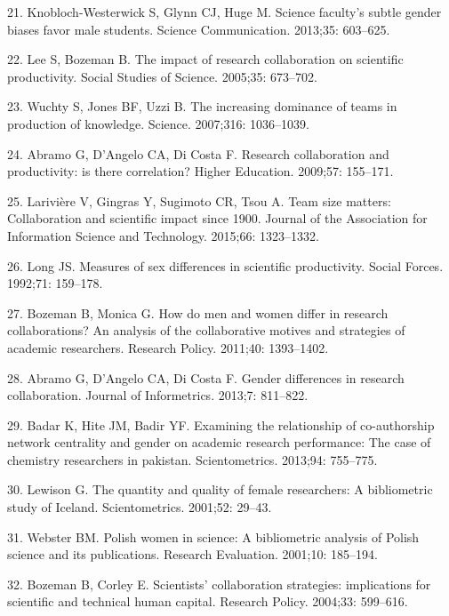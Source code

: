\documentclass[12pt,]{article}
\begin{document}
\hypertarget{ref-Knobloch_2013}{}
21. Knobloch-Westerwick S, Glynn CJ, Huge M. Science faculty's subtle
gender biases favor male students. Science Communication. 2013;35:
603--625.

\hypertarget{ref-Lee_2005}{}
22. Lee S, Bozeman B. The impact of research collaboration on scientific
productivity. Social Studies of Science. 2005;35: 673--702.

\hypertarget{ref-Wuchty_2007}{}
23. Wuchty S, Jones BF, Uzzi B. The increasing dominance of teams in
production of knowledge. Science. 2007;316: 1036--1039.

\hypertarget{ref-Abramo_2009}{}
24. Abramo G, D'Angelo CA, Di Costa F. Research collaboration and
productivity: is there correlation? Higher Education. 2009;57: 155--171.

\hypertarget{ref-Lariviere_2015}{}
25. Larivière V, Gingras Y, Sugimoto CR, Tsou A. Team size matters:
Collaboration and scientific impact since 1900. Journal of the
Association for Information Science and Technology. 2015;66: 1323--1332.

\hypertarget{ref-Long_1992}{}
26. Long JS. Measures of sex differences in scientific productivity.
Social Forces. 1992;71: 159--178.

\hypertarget{ref-Bozeman_2011}{}
27. Bozeman B, Monica G. How do men and women differ in research
collaborations? An analysis of the collaborative motives and strategies
of academic researchers. Research Policy. 2011;40: 1393--1402.

\hypertarget{ref-Abramo_2013}{}
28. Abramo G, D'Angelo CA, Di Costa F. Gender differences in research
collaboration. Journal of Informetrics. 2013;7: 811--822.

\hypertarget{ref-Badar_2013}{}
29. Badar K, Hite JM, Badir YF. Examining the relationship of
co-authorship network centrality and gender on academic research
performance: The case of chemistry researchers in pakistan.
Scientometrics. 2013;94: 755--775.

\hypertarget{ref-Lewison_2001}{}
30. Lewison G. The quantity and quality of female researchers: A
bibliometric study of Iceland. Scientometrics. 2001;52: 29--43.

\hypertarget{ref-Webster_2001}{}
31. Webster BM. Polish women in science: A bibliometric analysis of
Polish science and its publications. Research Evaluation. 2001;10:
185--194.

\hypertarget{ref-Bozeman_2004}{}
32. Bozeman B, Corley E. Scientists' collaboration strategies:
implications for scientific and technical human capital. Research
Policy. 2004;33: 599--616.
\end{document}
